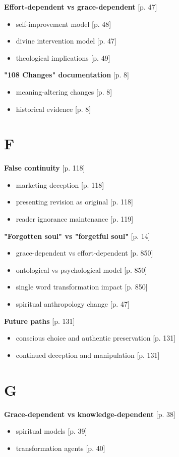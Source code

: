 \documentclass[11pt,twoside]{book}
\begin{document}
\textbf{\textbf{Effort-dependent vs grace-dependent}} {[}p. 47]
\begin{itemize}
\item self-improvement model [p. 48]
\item divine intervention model [p. 47]
\item theological implications [p. 49]
\end{itemize}

\textbf{\textbf{"108 Changes" documentation}} {[}p. 8]
\begin{itemize}
\item meaning-altering changes [p. 8]
\item historical evidence [p. 8]
\end{itemize}
\section*{F}
\label{sec:orge4ddadb}

\textbf{\textbf{False continuity}} {[}p. 118]
\begin{itemize}
\item marketing deception [p. 118]
\item presenting revision as original [p. 118]
\item reader ignorance maintenance [p. 119]
\end{itemize}

\textbf{\textbf{"Forgotten soul" vs "forgetful soul"}} {[}p. 14]
\begin{itemize}
\item grace-dependent vs effort-dependent [p. 850]
\item ontological vs psychological model [p. 850]
\item single word transformation impact [p. 850]
\item spiritual anthropology change [p. 47]
\end{itemize}

\textbf{\textbf{Future paths}} {[}p. 131]
\begin{itemize}
\item conscious choice and authentic preservation [p. 131]
\item continued deception and manipulation [p. 131]
\end{itemize}
\section*{G}
\label{sec:org9d98b1e}

\textbf{\textbf{Grace-dependent vs knowledge-dependent}} {[}p. 38]
\begin{itemize}
\item spiritual models [p. 39]
\item transformation agents [p. 40]
\end{itemize}
\end{document}
